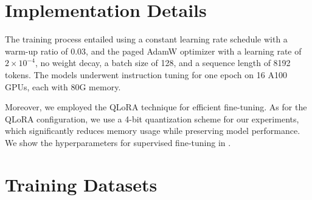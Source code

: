 \begin{table}[!tb]
\centering
\footnotesize
{}
\caption{Hyperparameters of supervised fine-tuning.}
\label{table:hyperparameters}
\end{table}

\begin{table}[!tb]
\centering
\setlength\tabcolsep{3.2pt}
\footnotesize
{}
\caption{The proportion of LongCite-45k, Neural-Bridge-RAG and Tulu3-SFT-Mix in the NCFT dataset.}
\label{table:proportion}
\end{table}

\section{Implementation Details}
\label{sec:training_details}
The training process entailed using a constant learning rate schedule with a warm-up ratio of 0.03, and the paged AdamW \cite{dettmers2024qlora, loshchilov2017adamw} optimizer with a learning rate of $2 \times 10^{-4}$, no weight decay, a batch size of 128, and a sequence length of 8192 tokens. 
The models underwent instruction tuning for one epoch on 16 A100 GPUs, each with 80G memory.

Moreover, we employed the QLoRA \cite{dettmers2024qlora} technique for efficient fine-tuning. 
As for the QLoRA configuration, we use a 4-bit quantization scheme for our experiments, which significantly reduces memory usage while preserving model performance.
We show the hyperparameters for supervised fine-tuning in .

\section{Training Datasets}
\label{sec:training_datasets}

